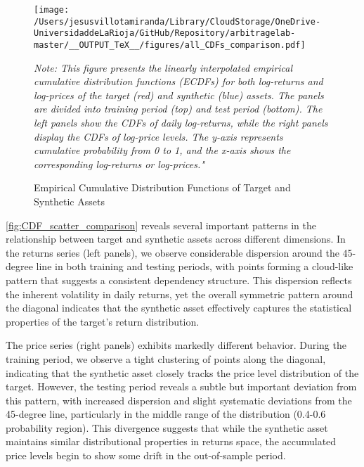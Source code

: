 \begin{figure}[H]
  \caption{Empirical Cumulative Distribution Functions of Target and Synthetic Assets}
  \centering
  \texttt{[image: /Users/jesusvillotamiranda/Library/CloudStorage/OneDrive-UniversidaddeLaRioja/GitHub/Repository/arbitragelab-master/\_\_OUTPUT\_TeX\_\_/figures/all\_CDFs\_comparison.pdf]}
  \label{fig:all_CDFs_comparison}
\vspace{0.5cm}
\begin{minipage}{\textwidth}
\setlength{\parindent}{0pt}
\small\textit{Note: 
This figure presents the linearly interpolated empirical cumulative distribution functions (ECDFs) for both log-returns and log-prices of the target (red) and synthetic (blue) assets. The panels are divided into training period (top) and test period (bottom). The left panels show the CDFs of daily log-returns, while the right panels display the CDFs of log-price levels. The y-axis represents cumulative probability from 0 to 1, and the x-axis shows the corresponding log-returns or log-prices."
}
\end{minipage}
\end{figure}

%
\cref{fig:CDF_scatter_comparison} reveals several important patterns in the relationship between target and synthetic assets across different dimensions. In the returns series (left panels), we observe considerable dispersion around the 45-degree line in both training and testing periods, with points forming a cloud-like pattern that suggests a consistent dependency structure. This dispersion reflects the inherent volatility in daily returns, yet the overall symmetric pattern around the diagonal indicates that the synthetic asset effectively captures the statistical properties of the target's return distribution.

The price series (right panels) exhibits markedly different behavior. During the training period, we observe a tight clustering of points along the diagonal, indicating that the synthetic asset closely tracks the price level distribution of the target. However, the testing period reveals a subtle but important deviation from this pattern, with increased dispersion and slight systematic deviations from the 45-degree line, particularly in the middle range of the distribution (0.4-0.6 probability region). This divergence suggests that while the synthetic asset maintains similar distributional properties in returns space, the accumulated price levels begin to show some drift in the out-of-sample period.

